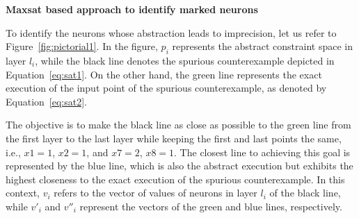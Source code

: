 \noindent\textbf{Maxsat based approach to identify marked neurons}\\
{\color{red} To identify the neurons whose abstraction leads to imprecision, let us refer to Figure~\ref{fig:pictorial1}. 
In the figure, $p_i$ represents the abstract constraint space in layer $l_i$, while the black line denotes 
the spurious counterexample depicted in Equation~\ref{eq:sat1}. 
On the other hand, the green line represents the exact execution of the input point of the spurious counterexample, 
as denoted by Equation~\ref{eq:sat2}.

The objective is to make the black line as close as possible to the green line from the first layer to the last layer 
while keeping the first and last points the same, i.e., $x1 = 1$, $x2 = 1$, and $x7 = 2$, $x8 = 1$. 
The closest line to achieving this goal is represented by the blue line, 
which is also the abstract execution but exhibits the highest closeness to the exact execution of the spurious counterexample.
In this context, $v_i$ refers to the vector of values of neurons in layer $l_i$ of the black line, 
while $v'_i$ and $v''_i$ represent the vectors of the green and blue lines, respectively.
}

